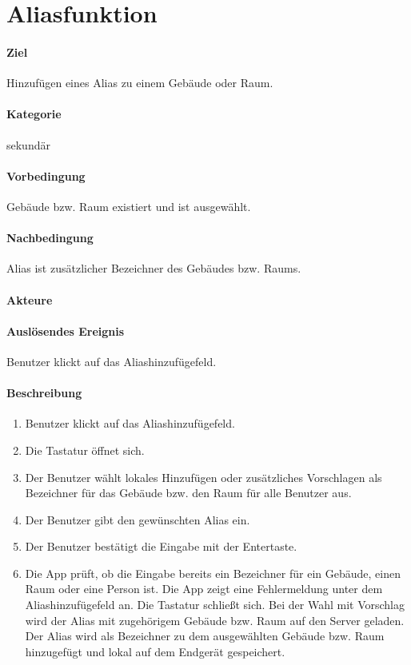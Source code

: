 \section{Aliasfunktion}
\paragraph{Ziel}
Hinzufügen eines Alias zu einem Gebäude oder Raum.
\paragraph{Kategorie}
sekundär
\paragraph{Vorbedingung}
Gebäude bzw. Raum existiert und ist ausgewählt.
\paragraph{Nachbedingung}
Alias ist zusätzlicher Bezeichner des Gebäudes bzw. Raums.
\paragraph{Akteure}

\paragraph{Auslösendes Ereignis}
Benutzer klickt auf das Aliashinzufügefeld.
\paragraph{Beschreibung}
\begin{enumerate}
    \item Benutzer klickt auf das Aliashinzufügefeld.
    \item Die Tastatur öffnet sich.
    \item Der Benutzer wählt lokales Hinzufügen oder zusätzliches Vorschlagen als Bezeichner für das Gebäude bzw. den Raum für alle Benutzer aus.
    \item Der Benutzer gibt den gewünschten Alias ein.
    \item Der Benutzer bestätigt die Eingabe mit der Entertaste.
    \item Die App prüft, ob die Eingabe bereits ein Bezeichner für ein Gebäude, einen Raum oder eine Person ist.
     Die App zeigt eine Fehlermeldung unter dem Aliashinzufügefeld an.
     Die Tastatur schließt sich.
    \subitem Bei der Wahl mit Vorschlag wird der Alias mit zugehörigem Gebäude bzw. Raum auf den Server geladen.
    \subitem Der Alias wird als Bezeichner zu dem ausgewählten Gebäude bzw. Raum hinzugefügt und lokal auf dem Endgerät gespeichert.
\end{enumerate}